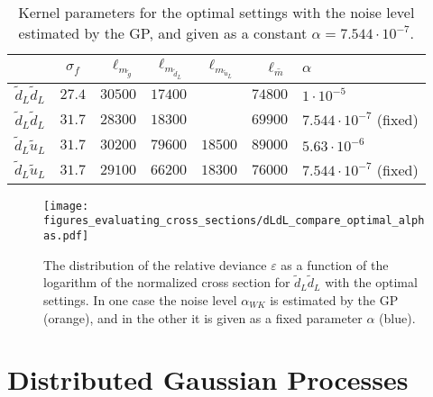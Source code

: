 \documentclass[twoside,english]{uiofysmaster}
\begin{document}
{%

  

\begin{table}
\centering
\begin{tabular}{@{}ccrrrrl@{}} \toprule
& $\sigma_f$ & $\ell_{m_{\widetilde{g}}}$ & $\ell_{m_{\widetilde{d}_L}}$ &$\ell_{m_{\widetilde{u}_L}}$ & $\ell_{\bar{m}}$ & $\alpha$\\
\midrule
$\widetilde{d}_L \widetilde{d}_L$ & $27.4$ & $30500$ & $17400$ && $74800$ & $1 \cdot 10^{-5}$\\
$\widetilde{d}_L \widetilde{d}_L$ & $31.7$ & $28300$ & $18300$ && $69900$ & $7.544 \cdot 10^{-7}$ (fixed)\\
$\widetilde{d}_L \widetilde{u}_L$ & $31.7$ & $30200$ & $79600$ & $18500$ & $89000$ & $5.63 \cdot 10^{-6}$\\
$\widetilde{d}_L \widetilde{u}_L$ & $31.7$ & $29100$ & $66200$ & $18300$ & $76000$ & $7.544 \cdot 10^{-7}$ (fixed)\\ \bottomrule
\end{tabular}
\caption{Kernel parameters for the optimal settings with the noise level estimated by the GP, and given as a constant $\alpha=7.544 \cdot 10^{-7}$.}
\label{Tab:: evaluating cross : optimal kernel parameters alpha}
\end{table}

\begin{figure}
\centering
\texttt{[image: figures\_evaluating\_cross\_sections/dLdL\_compare\_optimal\_alphas.pdf]}
\caption{The distribution of the relative deviance $\varepsilon$ as a function of the logarithm of the normalized cross section for $\widetilde{d}_L \widetilde{d}_L$ with the optimal settings. In one case the noise level $\alpha_{WK}$ is estimated by the GP (orange), and in the other it is given as a fixed parameter $\alpha$ (blue).}
\label{Fig:: evaluating cross : errors distribution alpha vs no alpha optimal}
\end{figure}




\section{Distributed Gaussian Processes}\label{Sec:: gaussian process : Distributed Gaussian Processes}



}
\end{document}
